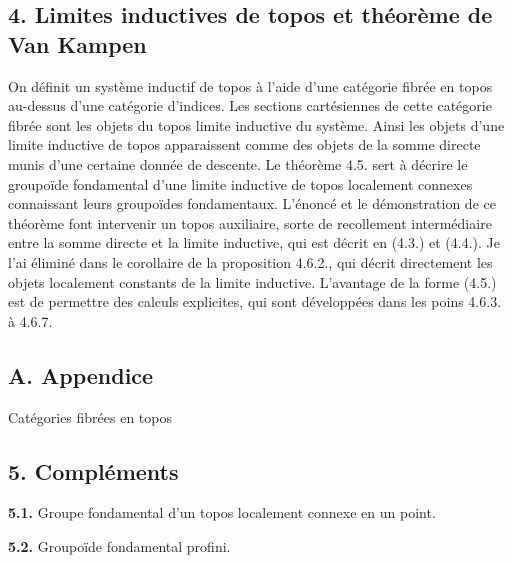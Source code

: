 \subsection*{4. Limites inductives de topos et théorème de Van Kampen}

On définit un système inductif de topos à l'aide d'une catégorie fibrée en topos au-dessus d'une catégorie d'indices. Les sections cartésiennes de cette catégorie fibrée sont les objets du topos limite inductive du système. Ainsi les objets d'une limite inductive de topos apparaissent comme des objets de la somme directe munis d'une certaine donnée de descente. Le théorème 4.5. sert à décrire le groupoïde fondamental d'une limite inductive de topos localement connexes connaissant leurs groupoïdes fondamentaux. L'énoncé et le démonstration de ce théorème font intervenir un topos auxiliaire, sorte de recollement intermédiaire entre la somme directe et la limite inductive, qui est décrit en (4.3.) et (4.4.). Je l'ai éliminé dans le corollaire de la proposition 4.6.2., qui décrit directement les objets localement constants de la limite inductive. L'avantage de la forme (4.5.) est de permettre des calculs explicites, qui sont développées dans les poins 4.6.3. à 4.6.7. 

\subsection*{A. Appendice}

Catégories fibrées en topos

\subsection*{5. Compléments}

{\bf 5.1.} Groupe fondamental d'un topos localement connexe en un point.

{\bf 5.2.} Groupoïde fondamental profini.








